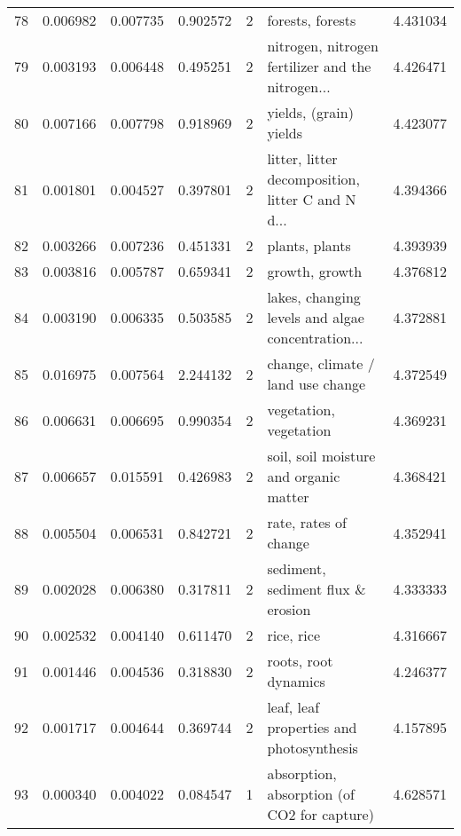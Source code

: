 \begin{tabular}{lrrrrlr}
78  &    0.006982 &  0.007735 &        0.902572 &           2 &                                   forests, forests &  4.431034 \\
79  &    0.003193 &  0.006448 &        0.495251 &           2 &  nitrogen, nitrogen fertilizer and the nitrogen... &  4.426471 \\
80  &    0.007166 &  0.007798 &        0.918969 &           2 &                             yields, (grain) yields &  4.423077 \\
81  &    0.001801 &  0.004527 &        0.397801 &           2 &  litter, litter decomposition, litter C and N d... &  4.394366 \\
82  &    0.003266 &  0.007236 &        0.451331 &           2 &                                     plants, plants &  4.393939 \\
83  &    0.003816 &  0.005787 &        0.659341 &           2 &                                     growth, growth &  4.376812 \\
84  &    0.003190 &  0.006335 &        0.503585 &           2 &  lakes, changing levels and algae concentration... &  4.372881 \\
85  &    0.016975 &  0.007564 &        2.244132 &           2 &                  change, climate / land use change &  4.372549 \\
86  &    0.006631 &  0.006695 &        0.990354 &           2 &                             vegetation, vegetation &  4.369231 \\
87  &    0.006657 &  0.015591 &        0.426983 &           2 &             soil, soil moisture and organic matter &  4.368421 \\
88  &    0.005504 &  0.006531 &        0.842721 &           2 &                              rate, rates of change &  4.352941 \\
89  &    0.002028 &  0.006380 &        0.317811 &           2 &                  sediment, sediment flux \& erosion &  4.333333 \\
90  &    0.002532 &  0.004140 &        0.611470 &           2 &                                         rice, rice &  4.316667 \\
91  &    0.001446 &  0.004536 &        0.318830 &           2 &                               roots, root dynamics &  4.246377 \\
92  &    0.001717 &  0.004644 &        0.369744 &           2 &           leaf, leaf properties and photosynthesis &  4.157895 \\
93  &    0.000340 &  0.004022 &        0.084547 &           1 &        absorption, absorption (of CO2 for capture) &  4.628571 \\

\end{tabular}
